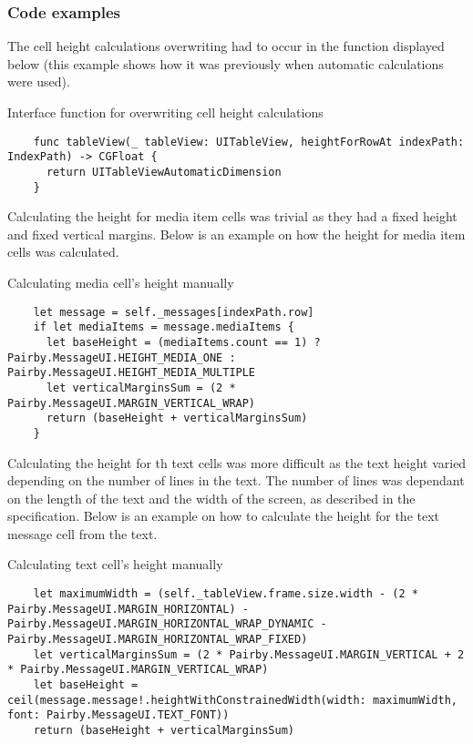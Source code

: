 \documentclass[a4paper,12pt]{article}
\begin{document}
\subsubsection{Code examples}
The cell height calculations overwriting had to occur in the function displayed below (this example shows how it was previously when automatic calculations were used).
\begin{listing}[H]
  \caption{Interface function for overwriting cell height calculations}
  \begin{verbatim}
    func tableView(_ tableView: UITableView, heightForRowAt indexPath: IndexPath) -> CGFloat {
      return UITableViewAutomaticDimension
    }
  \end{verbatim}
\end{listing}

Calculating the height for media item cells was trivial as they had a fixed height and fixed vertical margins. Below is an example on how the height for media item cells was calculated.
\begin{listing}[H]
  \caption{Calculating media cell's height manually}
  \begin{verbatim}
    let message = self._messages[indexPath.row]
    if let mediaItems = message.mediaItems {
      let baseHeight = (mediaItems.count == 1) ? Pairby.MessageUI.HEIGHT_MEDIA_ONE : Pairby.MessageUI.HEIGHT_MEDIA_MULTIPLE
      let verticalMarginsSum = (2 * Pairby.MessageUI.MARGIN_VERTICAL_WRAP)
      return (baseHeight + verticalMarginsSum)
    }
  \end{verbatim}
\end{listing}

Calculating the height for th text cells was more difficult as the text height varied depending on the number of lines in the text. The number of lines was dependant on the length of the text and the width of the screen, as described in the specification. Below is an example on how to calculate the height for the text message cell from the text.
\begin{listing}[H]
  \caption{Calculating text cell's height manually}
  \begin{verbatim}
    let maximumWidth = (self._tableView.frame.size.width - (2 * Pairby.MessageUI.MARGIN_HORIZONTAL) - Pairby.MessageUI.MARGIN_HORIZONTAL_WRAP_DYNAMIC - Pairby.MessageUI.MARGIN_HORIZONTAL_WRAP_FIXED)
    let verticalMarginsSum = (2 * Pairby.MessageUI.MARGIN_VERTICAL + 2 * Pairby.MessageUI.MARGIN_VERTICAL_WRAP)
    let baseHeight = ceil(message.message!.heightWithConstrainedWidth(width: maximumWidth, font: Pairby.MessageUI.TEXT_FONT))
    return (baseHeight + verticalMarginsSum)
  \end{verbatim}
\end{listing}
\end{document}
